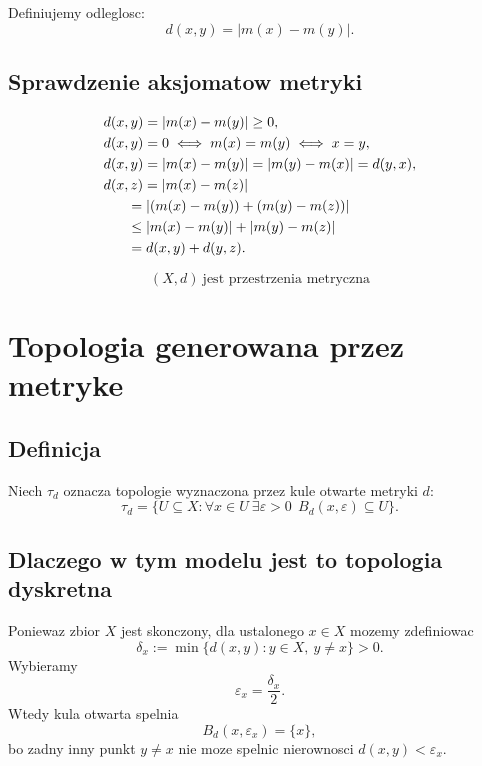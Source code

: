 \documentclass[10pt,a4paper]{article}
\theoremstyle{plain}
\theoremstyle{definition}
\begin{document}
Definiujemy odleglosc:
\[
d(x,y)=\lvert m(x)-m(y)\rvert.
\]

\subsection*{Sprawdzenie aksjomatow metryki}

\[
\begin{aligned}
&d(x,y)=\lvert m(x)-m(y)\rvert\ge 0,\\
&d(x,y)=0\iff m(x)=m(y)\iff x=y,\\
&d(x,y)=\lvert m(x)-m(y)\rvert=\lvert m(y)-m(x)\rvert=d(y,x),\\
&d(x,z)=\lvert m(x)-m(z)\rvert\\
&\hspace{1.7em}=\lvert (m(x)-m(y))+(m(y)-m(z))\rvert\\
&\hspace{1.7em}\le \lvert m(x)-m(y)\rvert+\lvert m(y)-m(z)\rvert\\
&\hspace{1.7em}=d(x,y)+d(y,z).
\end{aligned}
\]

\[
\boxed{(X,d)\ \text{jest przestrzenia metryczna}}
\]

\section{Topologia generowana przez metryke}

\subsection*{Definicja}

Niech $\tau_d$ oznacza topologie wyznaczona przez kule otwarte metryki $d$:
\[
\tau_d=\{U\subseteq X:\forall x\in U\ \exists\varepsilon>0\ \ B_d(x,\varepsilon)\subseteq U\}.
\]

\subsection*{Dlaczego w tym modelu jest to topologia dyskretna}

Poniewaz zbior $X$ jest skonczony, dla ustalonego $x\in X$ mozemy zdefiniowac
\[
\delta_x:=\min\{d(x,y):y\in X,\ y\ne x\}>0.
\]
Wybieramy
\[
\varepsilon_x=\frac{\delta_x}{2}.
\]
Wtedy kula otwarta spelnia
\[
B_d(x,\varepsilon_x)=\{x\},
\]
bo zadny inny punkt $y\ne x$ nie moze spelnic nierownosci
$d(x,y)<\varepsilon_x$.
\end{document}
